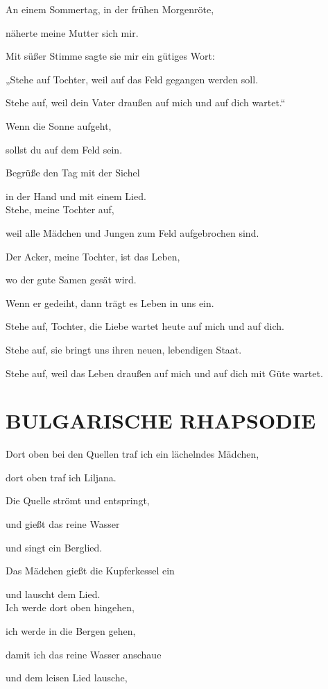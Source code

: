\documentclass[11pt,a5paper,twoside]{article}
\begin{document}
An einem Sommertag, in der frühen Morgenröte,

näherte meine Mutter sich mir.

Mit süßer Stimme sagte sie mir ein gütiges Wort:

„Stehe auf Tochter, weil auf das Feld gegangen werden soll.

Stehe auf, weil dein Vater draußen auf mich und auf dich wartet.“

Wenn die Sonne aufgeht,

sollst du auf dem Feld sein.

Begrüße den Tag mit der Sichel 

in der Hand und mit einem Lied.\\

Stehe, meine Tochter auf, 

weil alle Mädchen und Jungen zum Feld aufgebrochen sind.

Der Acker, meine Tochter, ist das Leben,

wo der gute Samen gesät wird.

Wenn er gedeiht, dann trägt es Leben in uns ein.

Stehe auf, Tochter, die Liebe wartet heute auf mich und auf dich.

Stehe auf, sie bringt uns ihren neuen, lebendigen Staat.

Stehe auf, weil das Leben draußen auf mich und auf dich mit Güte wartet.



\section[Bulgarische Rhapsodie]{BULGARISCHE RHAPSODIE}

Dort oben bei den Quellen traf ich ein lächelndes Mädchen,

dort oben traf ich Liljana.

Die Quelle strömt und entspringt,

und gießt das reine Wasser

und singt ein Berglied.

Das Mädchen gießt die Kupferkessel ein

und lauscht dem Lied.\\

Ich werde dort oben hingehen,

ich werde in die Bergen gehen,

damit ich das reine Wasser anschaue 

und dem leisen Lied lausche,
\end{document}
